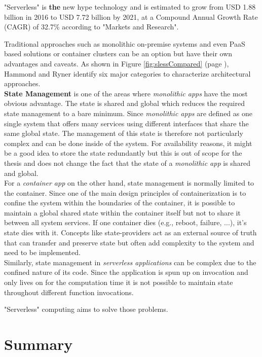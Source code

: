 "Serverless" is \textbf{the} new hype technology and is estimated to grow from USD 1.88 billion in 2016 to USD 7.72 billion by 2021, at a Compound Annual Growth Rate (CAGR) of 32.7\% according to "Markets and Research".\autocite{2017Function-as-a-Service2021} 

Traditional approaches such as monolithic on-premise systems and even \acf{PaaS} based solutions or container clusters can be an option but have their own advantages and caveats. As shown in Figure \ref{fig:slessCompared}
(page \pageref{fig:slessCompared}), Hammond and Ryner identify six major categories to characterize architectural approaches.\\
\textbf{State Management} is one of the areas where \textit{monolithic apps} have the most obvious advantage. The state is shared and global which reduces the required state management to a bare minimum. Since \textit{monolithic apps} are defined as one single system that offers many services using different interfaces that share the same global state. \autocite{Villamizar2015EvaluatingCloud} The management of this state is therefore not particularly complex and can be done inside of the system. For availability reasons, it might be a good idea to store the state redundantly but this is out of scope for the thesis and does not change the fact that the state of a \textit{monolithic app} is shared and global.\\
For a \textit{container app} on the other hand, state management is normally limited to the container. Since one of the main design principles of containerization is to confine the system within the boundaries of the container, it is possible to maintain a global shared state within the container itself but not to share it between all system services. If one container dies (e.g., reboot, failure, ...), it's state dies with it. Concepts like state-providers act as an external source of truth that can transfer and preserve state but often add complexity to the system and need to be implemented.\autocite{Ling2004SessionState}\\
Similarly, state management in \textit{serverless applications} can be complex due to the confined nature of its code. Since the application is spun up on invocation and only lives on for the computation time it is not possible to maintain state throughout different function invocations.

"Serverless" computing aims to solve those problems.\autocite{Roberts2016ServerlessArchitectures}


\section{Summary}
